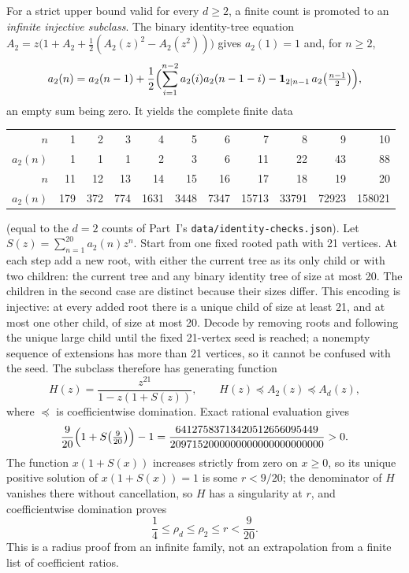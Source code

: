 \documentclass[11pt]{article}
\theoremstyle{definition}\newtheorem{definition}[theorem]{Definition}
\theoremstyle{remark}\newtheorem{remark}[theorem]{Remark}
\begin{document}
For a strict upper bound valid for every $d\ge2$, a finite count is promoted
to an \emph{infinite injective subclass}. The binary identity-tree equation
$A_2=z\bigl(1+A_2+\frac12(A_2(z)^2-A_2(z^2))\bigr)$ gives $a_2(1)=1$ and, for
$n\ge2$,
\begin{equation}\label{bit:cert:eq:binaryrec}
 a_2(n)=a_2(n-1)+\frac12\Bigl(
  \sum_{i=1}^{n-2}a_2(i)a_2(n-1-i)
  -\mathbf1_{2\mid n-1}\,a_2\bigl(\tfrac{n-1}2\bigr)\Bigr),
\end{equation}
an empty sum being zero. It yields the complete finite data
\begin{center}\small
\begin{tabular}{r|rrrrrrrrrr}\toprule
$n$&1&2&3&4&5&6&7&8&9&10\\
$a_2(n)$&1&1&1&2&3&6&11&22&43&88\\\midrule
$n$&11&12&13&14&15&16&17&18&19&20\\
$a_2(n)$&179&372&774&1631&3448&7347&15713&33791&72923&158021\\\bottomrule
\end{tabular}
\end{center}
(equal to the $d=2$ counts of Part~I's \texttt{data/identity-checks.json}).
Let $S(z)=\sum_{n=1}^{20}a_2(n)z^n$. Start from one fixed rooted path with 21
vertices. At each step add a new root, with either the current tree as its
only child or with two children: the current tree and any binary identity tree
of size at most 20. The children in the second case are distinct because their
sizes differ. This encoding is injective: at every added root there is a
unique child of size at least 21, and at most one other child, of size at most
20. Decode by removing roots and following the unique large child until the
fixed 21-vertex seed is reached; a nonempty sequence of extensions has more
than 21 vertices, so it cannot be confused with the seed. The subclass
therefore has generating function
\begin{equation}\label{bit:cert:eq:spine}
 H(z)=\frac{z^{21}}{1-z(1+S(z))},\qquad H(z)\preceq A_2(z)\preceq A_d(z),
\end{equation}
where $\preceq$ is coefficientwise domination. Exact rational evaluation
gives
\begin{equation}\label{bit:cert:eq:radiuscert}
 \frac9{20}\Bigl(1+S\bigl(\tfrac9{20}\bigr)\Bigr)-1
 =\frac{64127583713420512656095449}
        {2097152000000000000000000000}>0.
\end{equation}
The function $x(1+S(x))$ increases strictly from zero on $x\ge0$, so its
unique positive solution of $x(1+S(x))=1$ is some $r<9/20$; the denominator
of $H$ vanishes there without cancellation, so $H$ has a singularity at $r$,
and coefficientwise domination proves
\begin{equation}\label{bit:cert:eq:radiusbound}
 \frac14\le\rho_d\le\rho_2\le r<\frac9{20}.
\end{equation}
This is a radius proof from an infinite family, not an extrapolation from a
finite list of coefficient ratios.
\end{document}
